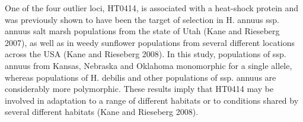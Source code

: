 \documentclass[11pt]{article}
\begin{document}
\begin{enumerate}
One of the four outlier loci, HT0414, is associated
with a heat-shock protein and was previously shown to
have been the target of selection in H. annuus ssp. annuus
salt marsh populations from the state of Utah
(Kane and Rieseberg 2007), as well as in weedy sunflower populations
from several different locations across the USA
(Kane and Rieseberg 2008). In this study, populations of
ssp. annuus from Kansas, Nebraska and Oklahoma
monomorphic for a single allele, whereas populations
of H. debilis and other populations of ssp. annuus are
considerably more polymorphic. These results imply
that HT0414 may be involved in adaptation to a range
of different habitats or to conditions shared by several
different habitats (Kane and Rieseberg 2008).
















\end{enumerate}
\end{document}
